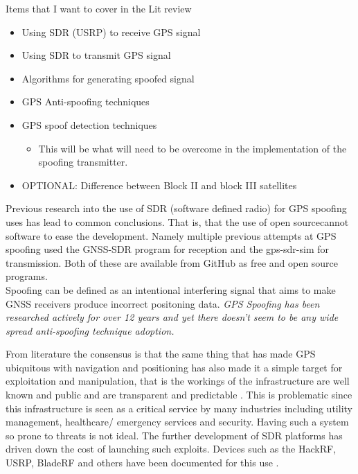 \bigskip
Items that I want to cover in the Lit review
\begin{itemize}
    \item Using SDR (USRP) to receive GPS signal
    \item Using SDR to transmit GPS signal
    \item Algorithms for generating spoofed signal
    \item GPS Anti-spoofing techniques
    \item GPS spoof detection techniques
    \begin{itemize}
        \item This will be what will need to be overcome in the implementation of the spoofing transmitter.
    \end{itemize}
    \item OPTIONAL: Difference between Block II and block III satellites
\end{itemize}
\medskip
Previous research into the use of SDR (software defined radio) for GPS spoofing uses has lead to common conclusions.
That is, that the use of open sourcecannot  software to ease the development. Namely multiple previous attempts at GPS spoofing
used the GNSS-SDR program for reception and the gps-sdr-sim for transmission. Both of these are available from GitHub as free
and open source programs.\\

Spoofing can be defined as an intentional interfering signal that aims to make GNSS receivers produce incorrect positoning data\cite{RN8}.
\emph{GPS Spoofing has been researched actively for over 12 years and yet there doesn't seem to be any wide spread anti-spoofing technique adoption.}

\bigskip
From literature the consensus is that the same thing that has made GPS ubiquitous with navigation and 
positioning has also made it a simple target for exploitation and manipulation, that is the workings
of the infrastructure are well known and public and are transparent and predictable \cite{RN7} \cite{RN4}. This is problematic since this infrastructure
is seen as a critical service by many industries including utility management, healthcare/ emergency services and security.
Having such a system so prone to threats is not ideal. The further development of SDR platforms has driven down the cost of launching
such exploits. Devices such as the HackRF, USRP, BladeRF and others have been documented for this use \cite{RN4} \cite{RN9}.

\medskip

